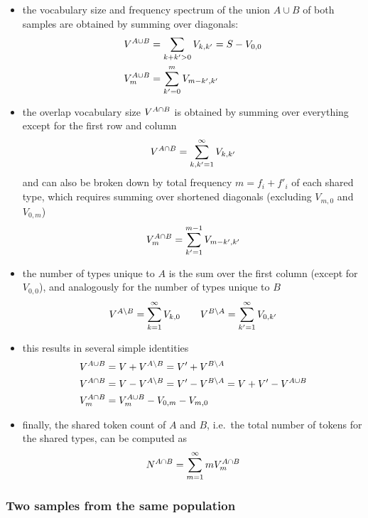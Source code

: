 \documentclass[a4paper]{article}
\begin{document}
\begin{itemize}
\item the vocabulary size and frequency spectrum of the union $A\cup B$ of both samples are obtained by summing over diagonals:
  \begin{align*}
    V^{A\cup B} &= \sum_{k+k' > 0} V_{k,k'} = S - V_{0,0} \\
    V^{A\cup B}_m &= \sum_{k'=0}^m V_{m - k', k'}
  \end{align*}
\item the overlap vocabulary size $V^{A\cap B}$ is obtained by summing over everything except for the first row and column
  \[
    V^{A\cap B} = \sum_{k, k' = 1}^{\infty} V_{k, k'}
  \]
  and can also be broken down by total frequency $m = f_i + f'_i$ of each shared type, which requires summing over shortened diagonals (excluding $V_{m,0}$ and $V_{0,m}$)
  \[
    V^{A\cap B}_m = \sum_{k'=1}^{m-1} V_{m - k', k'}
  \]
\item the number of types unique to $A$ is the sum over the first column (except for $V_{0,0}$), and analogously for the number of types unique to $B$
  \[
    V^{A\setminus B} = \sum_{k=1}^{\infty} V_{k,0} \qquad
    V^{B\setminus A} = \sum_{k'=1}^{\infty} V_{0,k'}
  \]
\item this results in several simple identities
  \begin{align*}
    V^{A\cup B} &= V + V^{A\setminus B} = V' + V^{B\setminus A} \\
    V^{A\cap B} &= V - V^{A\setminus B} = V' - V^{B\setminus A} = V + V' - V^{A\cup B} \\
    V^{A\cap B}_m &= V^{A\cup B}_m - V_{0,m} - V_{m,0}
  \end{align*}
\item finally, the shared token count of $A$ and $B$, i.e.\ the total number of tokens for the shared types, can be computed as
  \[
    N^{A\cap B} = \sum_{m=1}^{\infty} m V^{A\cap B}_m
  \]
\end{itemize}

\subsubsection{Two samples from the same population}
\label{sec:app:overlap:same}
\end{document}
